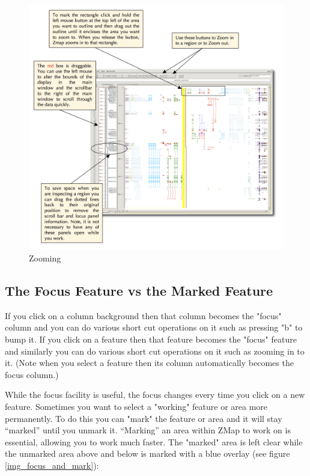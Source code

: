\documentclass[letterpaper]{article}
\begin{document}
\begin{figure}
\centering
\color[rgb]{0.30980393,0.5058824,0.7411765}
\includegraphics[width=15.231cm]{img_zooming.png}
\caption{Zooming}
\label{img_zooming}
\end{figure}

\subsection{The Focus Feature vs the Marked Feature}
If you click on a column background then that column becomes the "focus" column and you can do various short cut operations on it such as pressing "b" to bump it. If you click on a feature then that feature becomes the "focus" feature and similarly you can do various short cut operations on it such as zooming in to it. (Note when you select a feature then its column automatically becomes the focus column.)

While the focus facility is useful, the focus changes every time you click on a new feature. Sometimes you want to select a "working" feature or area more permanently. To do this you can "mark" the feature or area and it will stay ``marked'' until you unmark it. ``Marking'' an area within ZMap to work on is essential, allowing you to work much faster. The "marked" area is left clear while the unmarked area above and below is marked with a blue overlay (see figure \ref{img_focus_and_mark}):
\end{document}
